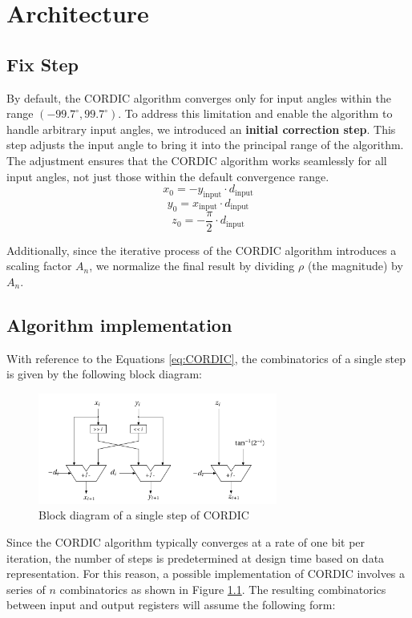 \chapter{Architecture}
\section{Fix Step}
\label{sec:fix_step}
By default, the CORDIC algorithm converges only for input angles within the range \( (-99.7^\circ, 99.7^\circ) \).
To address this limitation and enable the algorithm to handle arbitrary input angles, we introduced an \textbf{initial correction step}. This step adjusts the input angle to bring it into the principal range of the algorithm. The adjustment ensures that the CORDIC algorithm works seamlessly for all input angles, not just those within the default convergence range.
\[
    x_0 = -y_{\text{input}} \cdot d_{\text{input}}
\]
\[
    y_0 =  x_{\text{input}} \cdot d_{\text{input}}
\]
\[
    z_0 = -\frac{\pi}{2} \cdot d_{\text{input}}
\]

Additionally, since the iterative process of the CORDIC algorithm introduces a scaling factor \( A_n \), we normalize the final result by dividing \( \rho \) (the magnitude) by \( A_n \).

\section{Algorithm implementation}
\label{sec:algorithm_implementation}

With reference to the Equations \ref{eq:CORDIC}, the combinatorics of a single step is given by the following block diagram:

\begin{figure}[H]
    \centering
    \includegraphics[width=0.7\textwidth]{images/Architecture/basic_CORDIC.pdf}
    \caption{Block diagram of a single step of CORDIC}
    \label{fig:basic_CORDIC}
\end{figure}

Since the CORDIC algorithm typically converges at a rate of one bit per iteration, the number of steps is predetermined at design time based on data representation. For this reason, a possible implementation of CORDIC involves a series of \( n \) combinatorics as shown in Figure \ref{fig:basic_CORDIC}. The resulting combinatorics between input and output registers will assume the following form:


